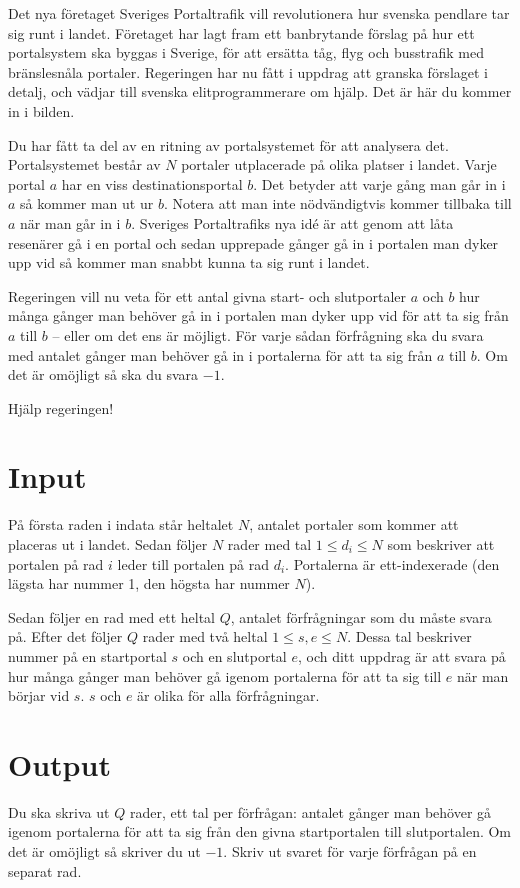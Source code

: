 
Det nya företaget Sveriges Portaltrafik vill revolutionera hur svenska
pendlare tar sig runt i landet. Företaget har lagt fram
ett banbrytande förslag på hur ett portalsystem ska byggas i Sverige, för
att ersätta tåg, flyg och busstrafik med bränslesnåla portaler. Regeringen
har nu fått i uppdrag att granska förslaget i detalj, och vädjar till
svenska elitprogrammerare om hjälp. Det är här du kommer in i bilden.

Du har fått ta del av en ritning av portalsystemet för att analysera det.
Portalsystemet består av $N$ portaler utplacerade på olika platser i landet. Varje portal $a$
har en viss destinationsportal $b$. Det betyder att varje gång man går in i $a$ så kommer man
ut ur $b$. Notera att man inte nödvändigtvis kommer tillbaka till $a$ när man går in i $b$.
Sveriges Portaltrafiks nya idé är att genom att låta resenärer gå
i en portal och sedan upprepade gånger gå in i portalen man dyker upp vid så kommer man snabbt
kunna ta sig runt i landet.

Regeringen vill nu veta för ett antal givna start- och slutportaler $a$ och $b$
hur många gånger man behöver gå in i portalen man dyker upp vid för att ta sig från $a$ till
$b$ -- eller om det ens är möjligt. För varje sådan förfrågning ska du svara med antalet
gånger man behöver gå in i portalerna för att ta sig från $a$ till $b$. Om det är omöjligt
så ska du svara $-1$.

Hjälp regeringen!

\section*{Input}

På första raden i indata står heltalet $N$, antalet portaler som kommer att placeras ut i landet.
Sedan följer $N$ rader med tal $1 \le d_i \le N$ som beskriver att portalen på rad $i$ leder till portalen på
rad $d_i$. Portalerna är ett-indexerade (den lägsta har nummer 1, den högsta har nummer $N$).

Sedan följer en rad med ett heltal $Q$, antalet förfrågningar som du måste svara på. Efter det
följer $Q$ rader med två heltal $1 \le s, e \le N$. Dessa tal beskriver nummer på en startportal $s$ och en
slutportal $e$, och ditt uppdrag är att svara på hur många gånger man behöver gå igenom portalerna
för att ta sig till $e$ när man börjar vid $s$. $s$ och $e$ är olika för alla förfrågningar.

\section*{Output}
Du ska skriva ut $Q$ rader, ett tal per förfrågan: antalet gånger man behöver gå
igenom portalerna för att ta sig från den givna startportalen till
slutportalen. Om det är omöjligt så skriver du ut $-1$. Skriv ut svaret
för varje förfrågan på en separat rad.

